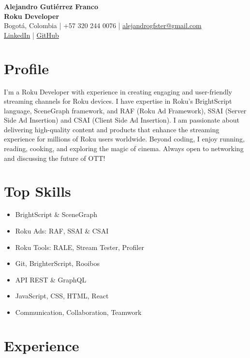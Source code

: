 \documentclass[11pt,a4paper]{article}
\begin{document}
\raggedright
\sloppy

\begin{center}
    {\LARGE \textbf{Alejandro Gutiérrez Franco}}\\
    \textbf{Roku Developer} \\
    Bogotá, Colombia | +57 320 244 0076 | \href{mailto:alejandrogfster@gmail.com}{alejandrogfster@gmail.com} \\
    \href{https://www.linkedin.com/in/alejandro-gutierrez-franco-06214674}{LinkedIn} |
    \href{https://github.com/fragualej/hello-roku}{GitHub}
\end{center}

\section*{Profile}
I'm a Roku Developer with experience in creating engaging and user-friendly streaming channels for Roku devices. I have expertise in Roku's BrightScript language, SceneGraph framework, and RAF (Roku Ad Framework), SSAI (Server Side Ad Insertion) and CSAI (Client Side Ad Insertion). I am passionate about delivering high-quality content and products that enhance the streaming experience for millions of Roku users worldwide. Beyond coding, I enjoy running, reading, cooking, and exploring the magic of cinema. Always open to networking and discussing the future of OTT!

\section*{Top Skills}
\begin{multicols}{2}
\begin{itemize}
    \item BrightScript \& SceneGraph
    \item Roku Ads: RAF, SSAI \& CSAI
    \item Roku Tools: RALE, Stream Tester, Profiler
    \item Git, BrighterScript, Rooibos
    \item API REST \& GraphQL
    \item JavaScript, CSS, HTML, React
    \item Communication, Collaboration, Teamwork
\end{itemize}
\end{multicols}

\section*{Experience}
\end{document}
